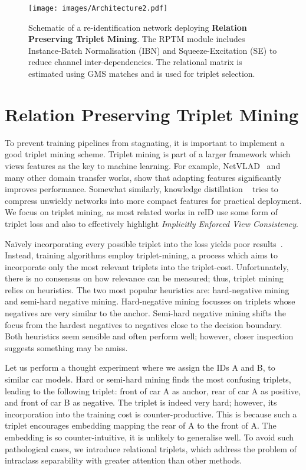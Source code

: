 \documentclass[10pt,twocolumn,letterpaper]{article}
\begin{document}
\begin{figure*}[t]
\begin{center}
\texttt{[image: images/Architecture2.pdf]}
\end{center}
   \caption{Schematic of a  re-identification network deploying  \textbf{Relation Preserving Triplet Mining}. 
   The RPTM module includes Instance-Batch Normalisation (IBN) and Squeeze-Excitation (SE)  to reduce channel inter-dependencies. The  relational  matrix is estimated using GMS matches and
   is used for triplet selection. }
\label{fig:arch}
\end{figure*}



\section{Relation Preserving  Triplet Mining}
 To prevent training pipelines from stagnating, it is important to implement a good triplet mining scheme. Triplet mining is part of a larger framework
which views features as the key to machine learning. For
example, NetVLAD~\cite{arandjelovic2016netvlad} and many other domain transfer works,
show that adapting features significantly improves performance.
Somewhat similarly, knowledge distillation ~\cite{park2019relational} tries to
compress unwieldy networks into more compact features
for practical deployment. We focus on triplet mining, as most related works in reID use some form of triplet loss and also to effectively highlight \textit{Implicitly Enforced View Consistency}.

Na\"ively incorporating every possible triplet into the loss yields poor results~\cite{hermans2017defense}. 
Instead, training algorithms  employ  triplet-mining, a process which aims to  incorporate
only the most relevant   triplets into the triplet-cost. Unfortunately,   there is no consensus on how relevance can be measured; thus, triplet mining relies on heuristics.
The two most   popular heuristics  are:  hard-negative mining and
semi-hard negative mining. Hard-negative mining focusses on triplets whose negatives are very similar to the anchor. Semi-hard
negative mining shifts the focus from the hardest negatives to negatives close to the decision boundary.
Both heuristics seem sensible and often perform well; however, closer inspection suggests something may be amiss.

Let us perform a thought experiment where we assign the IDs  A and B, to similar   car models. Hard or semi-hard mining
finds the most confusing triplets, leading to the following triplet: front of car A as anchor, rear of car A as positive, and
front of car B as negative. The  triplet is indeed very hard; however, its incorporation into the training cost is  counter-productive.
This is because such a triplet encourages embedding mapping the rear of A to the front of A.
 The embedding  is so counter-intuitive,  it is  unlikely to   generalise well.
 To avoid such pathological cases, we introduce relational triplets, which address
the problem of intraclass separability with greater
attention than other methods.
\end{document}

